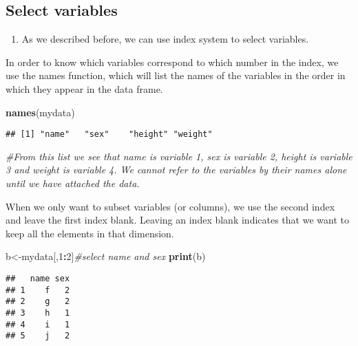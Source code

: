 \documentclass[]{book}
\newenvironment{Shaded}{\begin{snugshade}}{\end{snugshade}}
\newcommand{\KeywordTok}[1]{\textcolor[rgb]{0.13,0.29,0.53}{\textbf{#1}}}
\newcommand{\DecValTok}[1]{\textcolor[rgb]{0.00,0.00,0.81}{#1}}
\newcommand{\CommentTok}[1]{\textcolor[rgb]{0.56,0.35,0.01}{\textit{#1}}}
\newcommand{\OperatorTok}[1]{\textcolor[rgb]{0.81,0.36,0.00}{\textbf{#1}}}
\newcommand{\NormalTok}[1]{#1}
\providecommand{\tightlist}{%
  \setlength{\itemsep}{0pt}\setlength{\parskip}{0pt}}
\theoremstyle{definition}
\theoremstyle{definition}
\theoremstyle{definition}
\theoremstyle{remark}
\begin{document}
\subsection{Select variables}\label{select-variables}

\begin{enumerate}
\def\labelenumi{(\arabic{enumi})}
\tightlist
\item
  As we described before, we can use index system to select variables.
\end{enumerate}

In order to know which variables correspond to which number in the
index, we use the names function, which will list the names of the
variables in the order in which they appear in the data frame.

\begin{Shaded}
\begin{Highlighting}[]
\KeywordTok{names}\NormalTok{(mydata)}
\end{Highlighting}
\end{Shaded}

\begin{verbatim}
## [1] "name"   "sex"    "height" "weight"
\end{verbatim}

\begin{Shaded}
\begin{Highlighting}[]
\CommentTok{#From this list we see that name is variable 1, sex is variable 2, height is variable 3 and weight is variable 4. We cannot refer to the variables by their names alone until we have attached the data.}
\end{Highlighting}
\end{Shaded}

When we only want to subset variables (or columns), we use the second
index and leave the first index blank. Leaving an index blank indicates
that we want to keep all the elements in that dimension.

\begin{Shaded}
\begin{Highlighting}[]
\NormalTok{b<-mydata[,}\DecValTok{1}\OperatorTok{:}\DecValTok{2}\NormalTok{]}\CommentTok{#select name and sex}
\KeywordTok{print}\NormalTok{(b)}
\end{Highlighting}
\end{Shaded}

\begin{verbatim}
##   name sex
## 1    f   2
## 2    g   2
## 3    h   1
## 4    i   1
## 5    j   2
\end{verbatim}
\end{document}
